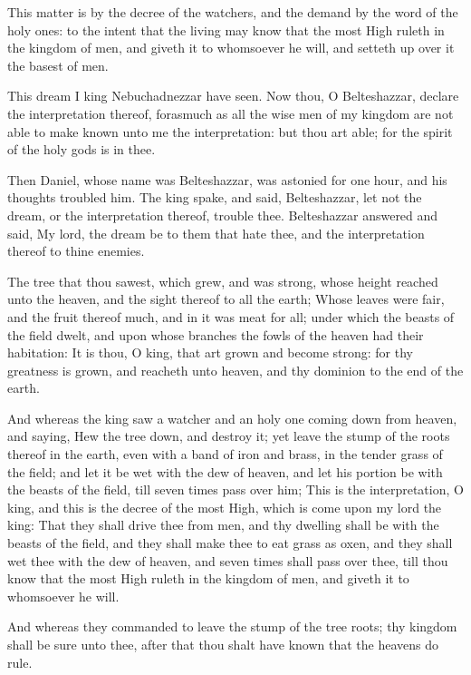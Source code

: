 \verse This matter is by the decree of the watchers, and the demand by the word of the holy ones: to the intent that the living may know that the most High ruleth in the kingdom of men, and giveth it to whomsoever he will, and setteth up over it the basest of men.

\verse This dream I king Nebuchadnezzar have seen. Now thou, O Belteshazzar, declare the interpretation thereof, forasmuch as all the wise men of my kingdom are not able to make known unto me the interpretation: but thou art able; for the spirit of the holy gods is in thee.

\verse Then Daniel, whose name was Belteshazzar, was astonied for one hour, and his thoughts troubled him. The king spake, and said, Belteshazzar, let not the dream, or the interpretation thereof, trouble thee. Belteshazzar answered and said, My lord, the dream be to them that hate thee, and the interpretation thereof to thine enemies.

\verse The tree that thou sawest, which grew, and was strong, whose height reached unto the heaven, and the sight thereof to all the earth; \verse Whose leaves were fair, and the fruit thereof much, and in it was meat for all; under which the beasts of the field dwelt, and upon whose branches the fowls of the heaven had their habitation: \verse It is thou, O king, that art grown and become strong: for thy greatness is grown, and reacheth unto heaven, and thy dominion to the end of the earth.

\verse And whereas the king saw a watcher and an holy one coming down from heaven, and saying, Hew the tree down, and destroy it; yet leave the stump of the roots thereof in the earth, even with a band of iron and brass, in the tender grass of the field; and let it be wet with the dew of heaven, and let his portion be with the beasts of the field, till seven times pass over him; \verse This is the interpretation, O king, and this is the decree of the most High, which is come upon my lord the king: \verse That they shall drive thee from men, and thy dwelling shall be with the beasts of the field, and they shall make thee to eat grass as oxen, and they shall wet thee with the dew of heaven, and seven times shall pass over thee, till thou know that the most High ruleth in the kingdom of men, and giveth it to whomsoever he will.

\verse And whereas they commanded to leave the stump of the tree roots; thy kingdom shall be sure unto thee, after that thou shalt have known that the heavens do rule.

